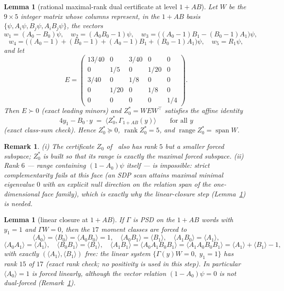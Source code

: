 \documentclass[11pt]{article}
\newtheorem{lemma}[theorem]{Lemma}
\newtheorem{remark}[theorem]{Remark}
\newcommand{\la}{\langle}
\newcommand{\ra}{\rangle}
\DeclareMathOperator{\rk}{rank}
\DeclareMathOperator{\range}{range}
\DeclareMathOperator{\Span}{span}
\begin{document}
\begin{lemma}[rational maximal-rank dual certificate at level $1{+}AB$]
\label{lem:dual}
Let $W$ be the $9\times5$ integer matrix whose columns represent, in the
$1{+}AB$ basis $\{\psi,A_i\psi,B_j\psi,A_iB_j\psi\}$, the vectors
\[
w_1=(A_0-B_0)\psi,\quad w_2=(A_0B_0-1)\psi,\quad
w_3=\bigl((A_0-1)B_1-(B_0-1)A_1\bigr)\psi,
\]
\[
w_4=\bigl((A_0-1)+(B_0-1)+(A_0-1)B_1+(B_0-1)A_1\bigr)\psi,\quad
w_5=R_1\psi,
\]
and let
\[
E=\begin{pmatrix}
13/40&0&3/40&0&0\\ 0&1/5&0&1/20&0\\ 3/40&0&1/8&0&0\\
0&1/20&0&1/8&0\\ 0&0&0&0&1/4
\end{pmatrix}.
\]
Then $E\succ0$ (exact leading minors) and $Z_0^\ast=WEW^\top$ satisfies the
affine identity
\[
4y_1-B_0\cdot y\;=\;\la Z_0^\ast,\Gamma_{1+AB}(y)\ra
\qquad\text{for all }y
\]
(exact class-sum check). Hence $Z_0^\ast\succeq0$, $\rk Z_0^\ast=5$, and
$\range Z_0^\ast=\Span W$.
\end{lemma}

\begin{remark}\label{rem:rank6}
(i) The certificate $Z_0$ of~\cite{overshoot} also has rank $5$ but a
smaller forced subspace; $Z_0^\ast$ is built so that its range is exactly
the maximal forced subspace. (ii) Rank $6$ --- range containing
$(1-A_0)\psi$ itself --- is impossible: strict complementarity fails at
this face (an SDP scan attains maximal minimal eigenvalue $0$ with an
explicit null direction on the relation span of the one-dimensional face
family), which is exactly why the linear-closure step
(Lemma~\ref{lem:closure}) is needed.
\end{remark}

\begin{lemma}[linear closure at $1{+}AB$]\label{lem:closure}
If $\Gamma$ is PSD on the $1{+}AB$ words with $y_1=1$ and $\Gamma W=0$,
then the $17$ moment classes are forced to
\[
\la A_0\ra=\la B_0\ra=\la A_0B_0\ra=1,\quad
\la A_0B_1\ra=\la B_1\ra,\quad \la A_1B_0\ra=\la A_1\ra,
\]
\[
\la A_0A_1\ra=\la A_1\ra,\quad \la B_0B_1\ra=\la B_1\ra,\quad
\la A_1B_1\ra=\la A_0A_1B_0B_1\ra=\la A_1A_0B_0B_1\ra=\la A_1\ra+\la
B_1\ra-1,
\]
with exactly $(\la A_1\ra,\la B_1\ra)$ free: the linear system
$\{\Gamma(y)W=0,\;y_1=1\}$ has rank $15$ of $17$ (exact rank check; no
positivity is used in this step). In particular $\la A_0\ra=1$ is forced
\emph{linearly}, although the vector relation $(1-A_0)\psi=0$ is not
dual-forced (Remark~\ref{rem:rank6}).
\end{lemma}
\end{document}
